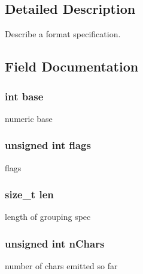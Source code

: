 \subsection{Detailed Description}
Describe a format specification. 

\subsection{Field Documentation}
\subsubsection[{\texorpdfstring{base}{base}}]{\setlength{\rightskip}{0pt plus 5cm}int base}\hypertarget{struct_t___format_spec_a19437a5875428e719515fb20de8a6927}{}\label{struct_t___format_spec_a19437a5875428e719515fb20de8a6927}
numeric base 
\subsubsection[{\texorpdfstring{flags}{flags}}]{\setlength{\rightskip}{0pt plus 5cm}unsigned int flags}\hypertarget{struct_t___format_spec_ac92588540e8c1d014a08cd8a45462b19}{}\label{struct_t___format_spec_ac92588540e8c1d014a08cd8a45462b19}
flags 
\subsubsection[{\texorpdfstring{len}{len}}]{\setlength{\rightskip}{0pt plus 5cm}size\+\_\+t len}\hypertarget{struct_t___format_spec_a7360b55975153b822efc5217b7734e6a}{}\label{struct_t___format_spec_a7360b55975153b822efc5217b7734e6a}
length of grouping spec 
\subsubsection[{\texorpdfstring{n\+Chars}{nChars}}]{\setlength{\rightskip}{0pt plus 5cm}unsigned int n\+Chars}\hypertarget{struct_t___format_spec_a31b304b5fa8417e800e3432a44729cf4}{}\label{struct_t___format_spec_a31b304b5fa8417e800e3432a44729cf4}
number of chars emitted so far 
